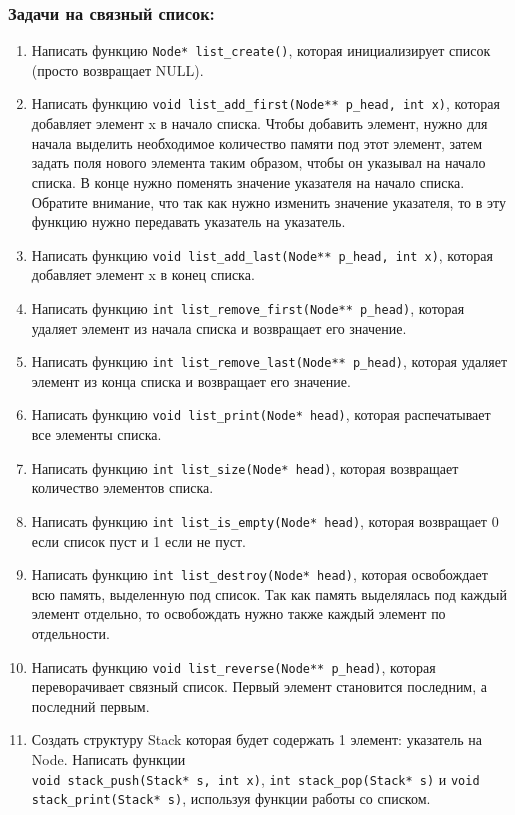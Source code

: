 \documentclass{article}
\begin{document}
\subsubsection*{Задачи на связный список:}
\begin{enumerate}
\item Написать функцию \texttt{Node* list\_create()}, которая инициализирует список (просто возвращает NULL).
\item Написать функцию \texttt{void list\_add\_first(Node** p\_head, int x)}, которая добавляет элемент x в начало списка. Чтобы добавить элемент, нужно для начала выделить необходимое количество памяти под этот элемент, затем задать поля нового элемента таким образом, чтобы он указывал на начало списка. В конце нужно поменять значение указателя на начало списка. Обратите внимание, что так как нужно изменить значение указателя, то в эту функцию нужно передавать указатель на указатель.
\item Написать функцию \texttt{void list\_add\_last(Node** p\_head, int x)}, которая добавляет элемент x в конец списка. 
\item Написать функцию \texttt{int list\_remove\_first(Node** p\_head)}, которая удаляет элемент из начала списка и возвращает его значение.
\item Написать функцию \texttt{int list\_remove\_last(Node** p\_head)}, которая удаляет элемент из конца списка и возвращает его значение. 
\item Написать функцию \texttt{void list\_print(Node* head)}, которая распечатывает все элементы списка.
\item Написать функцию \texttt{int list\_size(Node* head)}, которая возвращает количество элементов списка.
\item Написать функцию \texttt{int list\_is\_empty(Node* head)}, которая возвращает 0 если список пуст и 1 если не пуст.
\item Написать функцию \texttt{int list\_destroy(Node* head)}, которая освобождает всю память, выделенную под список. Так как память выделялась под каждый элемент отдельно, то освобождать нужно также каждый элемент по отдельности.

\item Написать функцию \texttt{void list\_reverse(Node** p\_head)}, которая переворачивает связный список. Первый элемент становится последним, а последний первым. 

\item Создать структуру Stack которая будет содержать 1 элемент: указатель на Node. Написать функции \\ \texttt{void stack\_push(Stack* s, int x)}, \texttt{int stack\_pop(Stack* s)} и \texttt{void stack\_print(Stack* s)}, используя функции работы со списком.


\end{enumerate}
\end{document}
